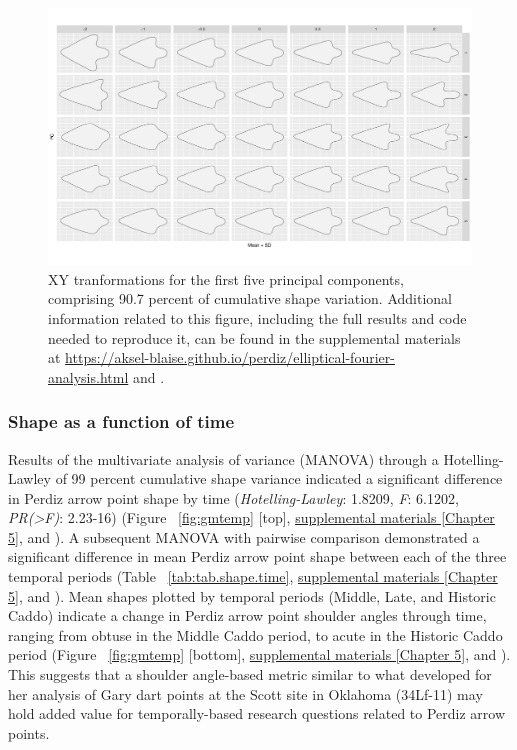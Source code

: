 \documentclass[review]{elsarticle}
\begin{document}
\begin{figure}[h!]\centering
\includegraphics[width=\linewidth]{pc.contrib.pdf}
\caption{XY tranformations for the first five principal components, comprising 90.7 percent of cumulative shape variation. Additional information related to this figure, including the full results and code needed to reproduce it, can be found in the supplemental materials at \href{https://aksel-blaise.github.io/perdiz/elliptical-fourier-analysis.html}{https://aksel-blaise.github.io/perdiz/elliptical-fourier-analysis.html} and \citealp{RN8980}.}
\label{fig:pc.contrib}
\end{figure}

\subsubsection*{Shape as a function of time}

Results of the multivariate analysis of variance (MANOVA) through a Hotelling-Lawley of 99 percent cumulative shape variance indicated a significant difference in Perdiz arrow point shape by time (\textit{Hotelling-Lawley}: 1.8209, \textit{F}: 6.1202, \textit{PR(>F)}: 2.23-16) (Figure ~\ref{fig:gmtemp} [top], \href{https://aksel-blaise.github.io/perdiz/elliptical-fourier-analysis.html}{supplemental materials [Chapter 5]}, and \citealp{RN8980}). A subsequent MANOVA with pairwise comparison demonstrated a significant difference in mean Perdiz arrow point shape between each of the three temporal periods (Table ~\ref{tab:tab.shape.time}, \href{https://aksel-blaise.github.io/perdiz/elliptical-fourier-analysis.html}{supplemental materials [Chapter 5]}, and \citealp{RN8980}). Mean shapes plotted by temporal periods (Middle, Late, and Historic Caddo) indicate a change in Perdiz arrow point shoulder angles through time, ranging from obtuse in the Middle Caddo period, to acute in the Historic Caddo period (Figure ~\ref{fig:gmtemp} [bottom], \href{https://aksel-blaise.github.io/perdiz/elliptical-fourier-analysis.html}{supplemental materials [Chapter 5]}, and \citealp{RN8980}). This suggests that a shoulder angle-based metric similar to what \citet{RN8275} developed for her analysis of Gary dart points at the Scott site in Oklahoma (34Lf-11) may hold added value for temporally-based research questions related to Perdiz arrow points.
\end{document}
